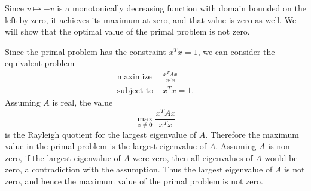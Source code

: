 \documentclass{article}
\newcommand{\0}{\mathbf{0}}
\begin{document}
\begin{enumerate}
\begin{enumerate}
    Since $v \mapsto -v$ is a monotonically decreasing function with domain bounded on the left by zero, it achieves its maximum at zero, and that value is zero as well.
    We will show that the optimal value of the primal problem is not zero.

    Since the primal problem has the constraint $x^T x = 1$, we can consider the equivalent problem
    \begin{align*}
      \text{maximize } & \frac{x^T A x}{x^T x} \\
      \text{subject to } & x^T x = 1.
    \end{align*}
    Assuming $A$ is real, the value
    \begin{equation*}
      \max_{x \neq \0} \frac{x^T A x}{x^T x}
    \end{equation*}
    is the Rayleigh quotient for the largest eigenvalue of $A$.
    Therefore the maximum value in the primal problem is the largest eigenvalue of $A$.
    Assuming $A$ is non-zero, if the largest eigenvalue of $A$ were zero, then all eigenvalues of $A$ would be zero, a contradiction with the assumption.
    Thus the largest eigenvalue of $A$ is not zero, and hence the maximum value of the primal problem is not zero.


\end{enumerate}
\end{enumerate}
\end{document}
